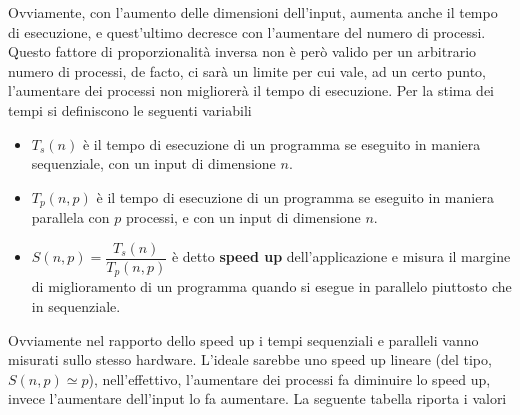 \documentclass[10pt, letterpaper]{report}
\begin{document}
Ovviamente, con l'aumento delle dimensioni dell'input, aumenta anche il tempo di esecuzione, e quest'ultimo 
decresce con l'aumentare del numero di processi. Questo fattore di proporzionalità inversa non è però 
valido per un arbitrario numero di processi, de facto, ci sarà un limite per cui vale, ad un certo punto, 
l'aumentare dei processi non migliorerà il tempo di esecuzione. Per la stima dei tempi si definiscono le 
seguenti variabili \begin{itemize}
    \item $T_s(n)$ è il tempo di esecuzione di un programma se eseguito in maniera sequenziale, con un 
    input di dimensione $n$. 
    \item $T_p(n,p)$ è il tempo di esecuzione di un programma se eseguito in maniera parallela con $p$ processi,
    e con un 
    input di dimensione $n$. 
    \item $S(n,p)=\dfrac{T_s(n)}{T_p(n,p)}$ è detto \textbf{speed up} dell'applicazione e misura il margine di 
    miglioramento di un programma quando si esegue in parallelo piuttosto che in sequenziale.
\end{itemize}
Ovviamente nel rapporto dello speed up i tempi sequenziali e paralleli vanno misurati sullo stesso 
hardware. L'ideale sarebbe uno speed up lineare (del tipo, $S(n,p)\simeq p$), nell'effettivo, l'aumentare dei processi 
fa diminuire lo speed up, invece l'aumentare dell'input lo fa aumentare. La seguente tabella riporta i valori 
\end{document}
